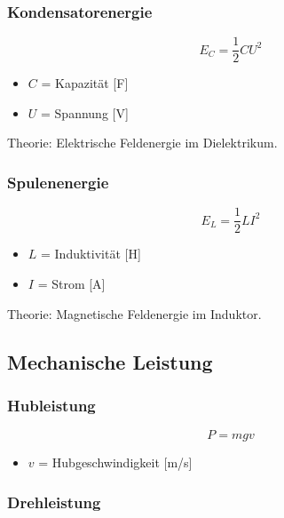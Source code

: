 \subsubsection{Kondensatorenergie}

\[
E_C = \frac{1}{2} C U^2
\]

\begin{itemize}
\item $C$ = Kapazität [F]
\item $U$ = Spannung [V]
\end{itemize}

Theorie:
Elektrische Feldenergie im Dielektrikum.

\subsubsection{Spulenenergie}

\[
E_L = \frac{1}{2} L I^2
\]

\begin{itemize}
\item $L$ = Induktivität [H]
\item $I$ = Strom [A]
\end{itemize}

Theorie:
Magnetische Feldenergie im Induktor.

\subsection{Mechanische Leistung}

\subsubsection{Hubleistung}

\[
P = m g v
\]

\begin{itemize}
\item $v$ = Hubgeschwindigkeit [m/s]
\end{itemize}

\subsubsection{Drehleistung}

